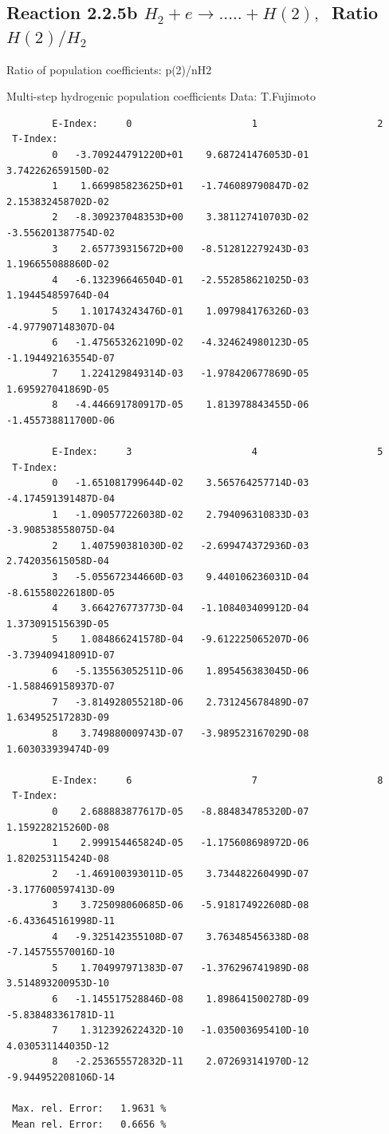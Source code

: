 \documentclass[12pt,dvips]{article}
\begin{document}
\subsection{
Reaction 2.2.5b  $H_2 + e \rightarrow .....+H(2)   , \  $
Ratio $H(2)/H_2 $
}

 Ratio of population coefficients: p(2)/nH2

 Multi-step hydrogenic population coefficients
 Data: T.Fujimoto


\begin{small}\begin{verbatim}
        E-Index:     0                     1                     2
 T-Index:
        0   -3.709244791220D+01    9.687241476053D-01    3.742262659150D-02
        1    1.669985823625D+01   -1.746089790847D-02    2.153832458702D-02
        2   -8.309237048353D+00    3.381127410703D-02   -3.556201387754D-02
        3    2.657739315672D+00   -8.512812279243D-03    1.196655088860D-02
        4   -6.132396646504D-01   -2.552858621025D-03    1.194454859764D-04
        5    1.101743243476D-01    1.097984176326D-03   -4.977907148307D-04
        6   -1.475653262109D-02   -4.324624980123D-05   -1.194492163554D-07
        7    1.224129849314D-03   -1.978420677869D-05    1.695927041869D-05
        8   -4.446691780917D-05    1.813978843455D-06   -1.455738811700D-06

        E-Index:     3                     4                     5
 T-Index:
        0   -1.651081799644D-02    3.565764257714D-03   -4.174591391487D-04
        1   -1.090577226038D-02    2.794096310833D-03   -3.908538558075D-04
        2    1.407590381030D-02   -2.699474372936D-03    2.742035615058D-04
        3   -5.055672344660D-03    9.440106236031D-04   -8.615580226180D-05
        4    3.664276773773D-04   -1.108403409912D-04    1.373091515639D-05
        5    1.084866241578D-04   -9.612225065207D-06   -3.739409418091D-07
        6   -5.135563052511D-06    1.895456383045D-06   -1.588469158937D-07
        7   -3.814928055218D-06    2.731245678489D-07    1.634952517283D-09
        8    3.749880009743D-07   -3.989523167029D-08    1.603033939474D-09

        E-Index:     6                     7                     8
 T-Index:
        0    2.688883877617D-05   -8.884834785320D-07    1.159228215260D-08
        1    2.999154465824D-05   -1.175608698972D-06    1.820253115424D-08
        2   -1.469100393011D-05    3.734482260499D-07   -3.177600597413D-09
        3    3.725098060685D-06   -5.918174922608D-08   -6.433645161998D-11
        4   -9.325142355108D-07    3.763485456338D-08   -7.145755570016D-10
        5    1.704997971383D-07   -1.376296741989D-08    3.514893200953D-10
        6   -1.145517528846D-08    1.898641500278D-09   -5.838483361781D-11
        7    1.312392622432D-10   -1.035003695410D-10    4.030531144035D-12
        8   -2.253655572832D-11    2.072693141970D-12   -9.944952208106D-14

 Max. rel. Error:   1.9631 %
 Mean rel. Error:   0.6656 %


\end{verbatim}\end{small}
\end{document}
